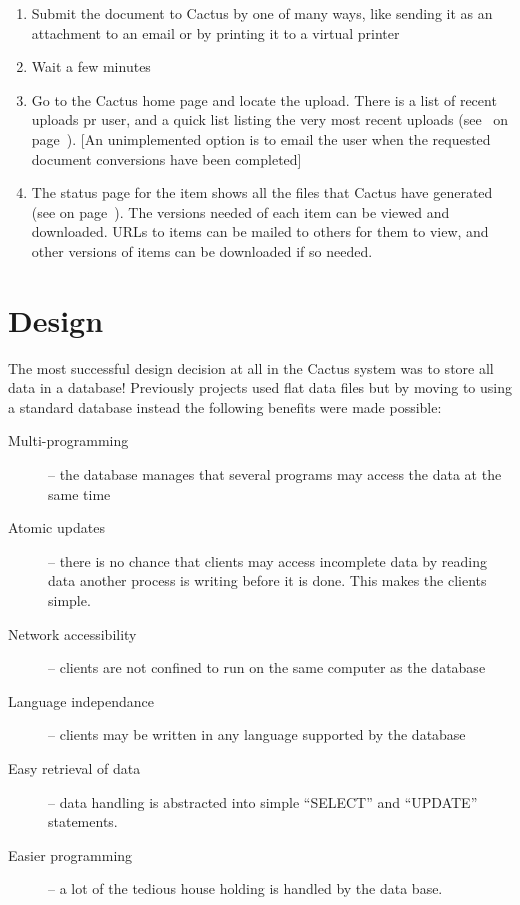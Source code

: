 \begin{enumerate}
\item Submit the document to Cactus by one of many ways,
  like sending it as an attachment to an email or by
  printing it to a virtual printer
  
\item Wait a few minutes
  
\item Go to the Cactus home page and locate the upload.  There is a
  list of recent uploads pr user, and a quick list listing the very
  most recent uploads (see~ on
  page~\pageref{fig:cactus-ten-most-recent}).  [An unimplemented
  option is to email the user when the requested document conversions
  have been completed]

\item The status page for the item shows all the files that Cactus
  have generated (see  on
  page~\pageref{fig:cactus-splitted-email-from-lars}).  The versions
  needed of each item can be viewed and downloaded.  URLs to items can
  be mailed to others for them to view, and other versions of items
  can be downloaded if so needed.
\end{enumerate}

\section{Design}
\label{sec:cactus-design}

The most successful design decision at all in the Cactus system was to
store all data in a database!  Previously projects used flat data
files but by moving to using a standard database instead the following
benefits were made possible:

\begin{description}
\item[Multi-programming] -- the database manages that several programs
  may access the data at the same time
\item[Atomic updates] --  there is no chance that clients may access
  incomplete data by reading data another process is writing before it
  is done.  This makes the clients simple.
\item[Network accessibility] -- clients are not confined to run on the
  same computer as the database
\item[Language independance] -- clients may be written in any language
  supported by the database
\item[Easy retrieval of data] -- data handling is abstracted into
   simple ``SELECT'' and ``UPDATE'' statements.
   
\item[Easier programming] -- a lot of the tedious house holding is
  handled by the data base.
\end{description}

